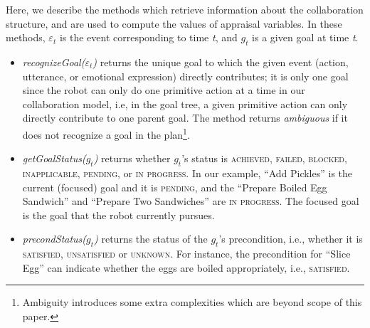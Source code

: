 \documentclass{article}
\begin{document}

Here, we describe the methods which retrieve information about the collaboration
structure, and are used to compute the values of appraisal variables. In these
methods, $\varepsilon_t$ is the event corresponding to time \textit{t}, and
$g_t$ is a given goal at time \textit{t}.

\begin{itemize}[leftmargin=2pt]
  \setlength\itemsep{0.02mm}
  \item \textit{recognizeGoal($\varepsilon_t$)} returns the unique goal to which
  the given event (action, utterance, or emotional expression) directly
  contributes; it is only one goal since the robot can only do one primitive
  action at a time in our collaboration model, i.e, in the goal tree, a given
  primitive action can only directly contribute to one parent goal. The method
  returns \textit{ambiguous} if it does not recognize a goal in the
  plan\footnote{Ambiguity introduces some extra complexities which are beyond
  scope of this paper.}.
   
  
  \item \textit{getGoalStatus($g_t$)} returns whether $g_t$'s status is
  \textsc{achieved, failed, blocked, inapplicable, pending,} or \textsc{in
  progress}. In our example, ``Add Pickles'' is the current (focused) goal and
  it is \textsc{pending}, and the ``Prepare Boiled Egg Sandwich'' and ``Prepare
  Two Sandwiches'' are \textsc{in progress}. The focused goal is the goal
  that the robot currently pursues.
  
  \item \textit{precondStatus($g_t$)} returns the status of the $g_t$'s
  precondition, i.e., whether it is \textsc{satisfied, unsatisfied} or
  \textsc{unknown}. For instance, the precondition for ``Slice Egg'' can
  indicate whether the eggs are boiled appropriately, i.e., \textsc{satisfied}.
  

\end{itemize}
\end{document}
